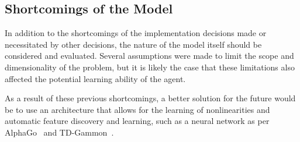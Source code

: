 
\subsection{Shortcomings of the Model}
\label{sec:disc-shortcomings}

In addition to the shortcomings of the implementation decisions made or
necessitated by other decisions,
the nature of the model itself should be considered and evaluated.
%
Several assumptions were made to limit the scope and dimensionality of the
problem,
but it is likely the case that these limitations also affected the
potential learning ability of the agent.






As a result of these previous shortcomings,
a better solution for the future would be to use an architecture that allows
for the learning of nonlinearities and automatic feature discovery and
learning,
such as a neural network
as per AlphaGo~\cite{deepmind_alphago} and TD-Gammon~\cite{tdgammon}.

